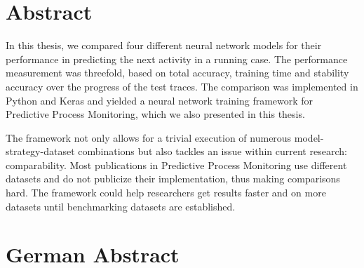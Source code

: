 


\begingroup
\let\clearpage\relax
\let\cleardoublepage\relax
\let\cleardoublepage\relax

\chapter*{Abstract}
In this thesis, we compared four different neural network models for their performance in predicting the next activity in a running case. The performance measurement was threefold, based on total accuracy, training time and stability accuracy over the progress of the test traces. The comparison was implemented in Python and Keras and yielded a neural network training framework for Predictive Process Monitoring, which we also presented in this thesis.

The framework not only allows for a trivial execution of numerous model-strategy-dataset combinations but also tackles an issue within current research: comparability. Most publications in Predictive Process Monitoring use different datasets and do not publicize their implementation, thus making comparisons hard. The framework could help researchers get results faster and on more datasets until benchmarking datasets are established.\\

\vfill

\chapter*{German Abstract}

\endgroup

\vfill
